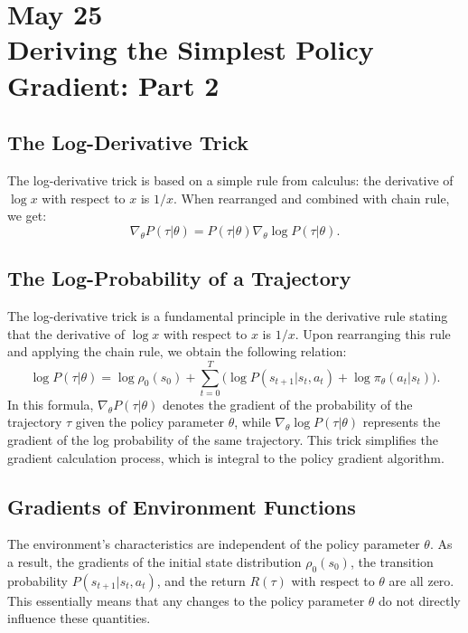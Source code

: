\section{May 25\\ 
{\large Deriving the Simplest Policy Gradient: Part 2}}


\subsection{The Log-Derivative Trick}

The log-derivative trick is based on a simple rule from calculus: the derivative of $\log x$ with respect to $x$ is $1/x$. When rearranged and combined with chain rule, we get:
$$\nabla_{\theta} P(\tau | \theta) = P(\tau | \theta) \nabla_{\theta} \log P(\tau | \theta).$$

\subsection{The Log-Probability of a Trajectory}\label{log_prob}

The log-derivative trick is a fundamental principle in the derivative rule stating that the derivative of $\log x$ with respect to $x$ is $1/x$. Upon rearranging this rule and applying the chain rule, we obtain the following relation:
$$
\log P(\tau|\theta) = \log \rho_0 (s_0) + \sum_{t=0}^{T} \bigg( \log P(s_{t+1}|s_t, a_t)  + \log \pi_{\theta}(a_t |s_t)\bigg).$$
In this formula, $\nabla_{\theta} P(\tau | \theta)$ denotes the gradient of the probability of the trajectory $\tau$ given the policy parameter $\theta$, while $\nabla_{\theta} \log P(\tau | \theta)$ represents the gradient of the log probability of the same trajectory. This trick simplifies the gradient calculation process, which is integral to the policy gradient algorithm.

\subsection{Gradients of Environment Functions}\label{sec_gradient_env}

The environment's characteristics are independent of the policy parameter $\theta$. As a result, the gradients of the initial state distribution $\rho_0(s_0)$, the transition probability $P(s_{t+1}|s_t, a_t)$, and the return $R(\tau)$ with respect to $\theta$ are all zero. This essentially means that any changes to the policy parameter $\theta$ do not directly influence these quantities.

